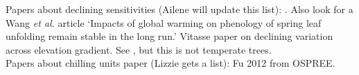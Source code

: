 \documentclass{article}
\begin{document}
Papers about declining sensitivities (Ailene will update this list): \cite{Rutishauser:2008,fu2015}. Also look for a Wang \emph{et al.} article `Impacts of global warming on phenology of spring leaf unfolding remain stable in the long run.' Vitasse paper on declining variation across elevation gradient. See \cite{yu2010}, but this is not temperate trees. \\

Papers about chilling units paper (Lizzie gets a list): Fu 2012 from OSPREE. \cite{harrington2015}\cite{lued2011,Luedeling:2011qe,Luedeling2013AgFM}\\



\end{document}

